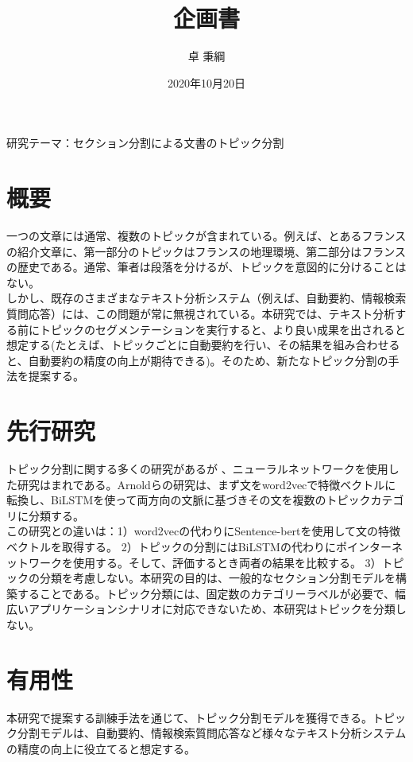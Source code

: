 \documentclass[a4paper]{article}
\title{企画書}
\date{2020年10月20日}
\author{卓 秉綱}
\begin{document}
\maketitle
研究テーマ：セクション分割による文書のトピック分割

\section{概要}

一つの文章には通常、複数のトピックが含まれている。例えば、とあるフランスの紹介文章に、第一部分のトピックはフランスの地理環境、第二部分はフランスの歴史である。通常、筆者は段落を分けるが、トピックを意図的に分けることはない。\\

しかし、既存のさまざまなテキスト分析システム（例えば、自動要約、情報検索 質問応答）には、この問題が常に無視されている。本研究では、テキスト分析する前にトピックのセグメンテーションを実行すると、より良い成果を出されると想定する(たとえば、トピックごとに自動要約を行い、その結果を組み合わせると、自動要約の精度の向上が期待できる)。そのため、新たなトピック分割の手法を提案する。\\

\section{先行研究}

トピック分割に関する多くの研究があるが 、ニューラルネットワークを使用した研究はまれである。Arnoldらの研究\cite{arnold2019sector}は、まず文をword2vecで特徴ベクトルに転換し、BiLSTMを使って両方向の文脈に基づきその文を複数のトピックカテゴリに分類する。\\

この研究との違いは：1）word2vecの代わりにSentence-bertを使用して文の特徴ベクトルを取得する。 2）トピックの分割にはBiLSTMの代わりにポインターネットワークを使用する。そして、評価するとき両者の結果を比較する。 3）トピックの分類を考慮しない。本研究の目的は、一般的なセクション分割モデルを構築することである。トピック分類には、固定数のカテゴリーラベルが必要で、幅広いアプリケーションシナリオに対応できないため、本研究はトピックを分類しない。


\section{有用性}

本研究で提案する訓練手法を通じて、トピック分割モデルを獲得できる。トピック分割モデルは、自動要約、情報検索質問応答など様々なテキスト分析システムの精度の向上に役立てると想定する。
\end{document}
